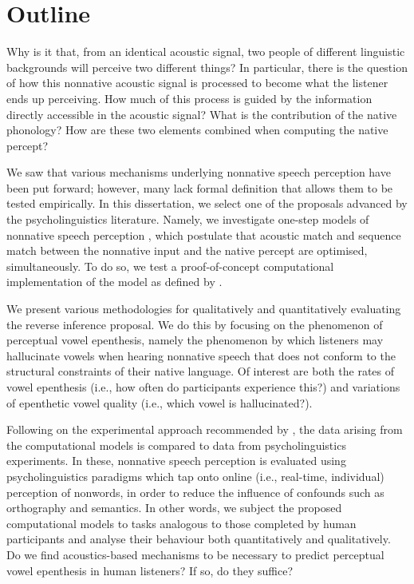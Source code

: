 \section{Outline}
Why is it that, from an identical acoustic signal, two people of different linguistic backgrounds will perceive two different things? In particular, there is the question of how this nonnative acoustic signal is processed to become what the listener ends up perceiving. How much of this process is guided by the information directly accessible in the acoustic signal? What is the contribution of the native phonology? How are these two elements combined when computing the native percept?

We saw that various mechanisms underlying nonnative speech perception have been put forward; however, many lack formal definition that allows them to be tested empirically.  
In this dissertation, we select one of the proposals advanced by the psycholinguistics literature. Namely, we investigate one-step models of nonnative speech perception \cite{dupoux2011, dejong2012, wilson2013, durvasula2015}, which postulate that acoustic match and sequence match between the nonnative input and the native percept are optimised, simultaneously. To do so, we test a proof-of-concept computational implementation of the model as defined by \cite{wilson2013}. 

We present various methodologies for qualitatively and quantitatively evaluating the reverse inference proposal. We do this by focusing on the phenomenon of perceptual vowel epenthesis, namely the phenomenon by which listeners may hallucinate vowels when hearing nonnative speech that does not conform to the structural constraints of their native language. Of interest are both the rates of vowel epenthesis (i.e., how often do participants experience this?) and variations of epenthetic vowel quality (i.e., which vowel is hallucinated?).

Following on the experimental approach recommended by \cite{vendelin2006}, the data arising from the computational models is compared to data from psycholinguistics experiments. In these, nonnative speech perception is evaluated using psycholinguistics paradigms which tap onto online (i.e., real-time, individual) perception of nonwords, in order to reduce the influence of confounds such as orthography and semantics.
In other words, we subject the proposed computational models to tasks analogous to those completed by human participants and analyse their behaviour both quantitatively and qualitatively. Do we find acoustics-based mechanisms to be necessary to predict perceptual vowel epenthesis in human listeners? If so, do they suffice?

